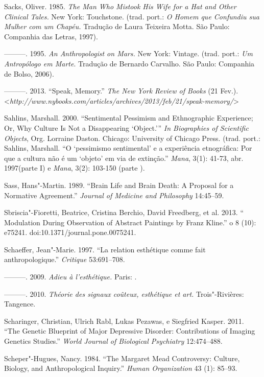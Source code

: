 Sacks, Oliver. 1985. \emph{The Man Who Mistook His Wife for a Hat and
Other Clinical Tales.} New York: Touchstone. (trad. port.: \emph{O Homem
que Confundiu sua Mulher com um Chapéu.} Tradução de Laura Teixeira
Motta. São Paulo: Companhia das Letras, 1997).

---------. 1995. \emph{An Anthropologist on Mars.} New York: Vintage.
(trad. port.: \emph{Um Antropólogo em Marte}. Tradução de Bernardo
Carvalho. São Paulo: Companhia de Bolso, 2006).

---------. 2013. ``Speak, Memory.'' \emph{The New York Review of Books}
(21 Fev.).
\textless{}\emph{http://www.nybooks.com/articles/archives/2013/feb/21/speak-memory/}\textgreater{}

Sahlins, Marshall. 2000. ``Sentimental Pessimism and Ethnographic
Experience; Or, Why Culture Is Not a Disappearing `Object.''' \emph{In
Biographies of Scientific Objects}, Org. Lorraine Daston. Chicago:
University of Chicago Press. (trad. port.: Sahlins, Marshall. ``O
`pessimismo sentimental' e a experiência etnográfica: Por que a cultura
não é um `objeto' em via de extinção.'' \emph{Mana}, 3(1): 41-73, abr.
1997(parte I) e \emph{Mana}, 3(2): 103-150 (parte ).

Sass, Hans"-Martin. 1989. ``Brain Life and Brain Death: A Proposal for a
Normative Agreement.'' \emph{Journal of Medicine and Philosophy}
14:45--59.

Sbriscia"-Fioretti, Beatrice, Cristina Berchio, David Freedberg, et al.
2013. `` Modulation During Observation of Abstract Paintings by Franz
Kline.'' o 8 (10): e75241. doi:10.1371/journal.pone.0075241.

Schaeffer, Jean"-Marie. 1997. ``La relation esthétique comme fait
anthropologique.'' \emph{Critique} 53:691--708.

---------. 2009. \emph{Adieu à l'esthétique.} Paris: .

---------. 2010. \emph{Théorie des signaux coûteux, esthétique et art.}
Trois"-Rivières: Tangence.

Scharinger, Christian, Ulrich Rabl, Lukas Pezawas, e Siegfried Kasper.
2011. ``The Genetic Blueprint of Major Depressive Disorder:
Contributions of Imaging Genetics Studies.'' \emph{World Journal of
Biological Psychiatry} 12:474--488.

Scheper"-Hugues, Nancy. 1984. ``The Margaret Mead Controversy: Culture,
Biology, and Anthropological Inquiry.'' \emph{Human Organization} 43
(1): 85--93.

